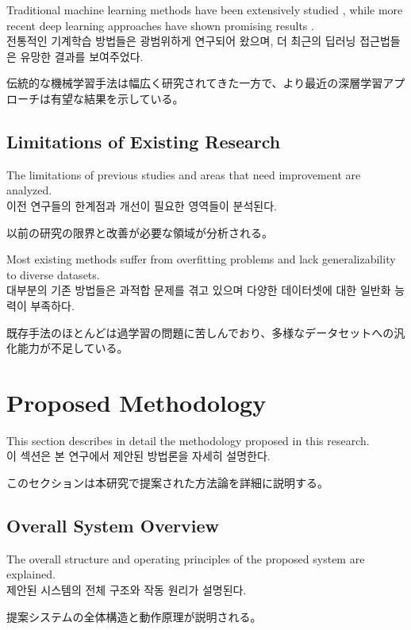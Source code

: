 \documentclass[preprint,12pt]{elsarticle}
\begin{document}
Traditional machine learning methods have been extensively studied \cite{hastie2009elements}, while more recent deep learning approaches have shown promising results \cite{schmidhuber2015deep}. \\
전통적인 기계학습 방법들은 광범위하게 연구되어 왔으며, 더 최근의 딥러닝 접근법들은 유망한 결과를 보여주었다. \\
\begin{CJK}{UTF8}{min}
伝統的な機械学習手法は幅広く研究されてきた一方で、より最近の深層学習アプローチは有望な結果を示している。
\end{CJK}

\subsection{Limitations of Existing Research}
The limitations of previous studies and areas that need improvement are analyzed. \\
이전 연구들의 한계점과 개선이 필요한 영역들이 분석된다. \\
\begin{CJK}{UTF8}{min}
以前の研究の限界と改善が必要な領域が分析される。
\end{CJK}

Most existing methods suffer from overfitting problems and lack generalizability to diverse datasets. \\
대부분의 기존 방법들은 과적합 문제를 겪고 있으며 다양한 데이터셋에 대한 일반화 능력이 부족하다. \\
\begin{CJK}{UTF8}{min}
既存手法のほとんどは過学習の問題に苦しんでおり、多様なデータセットへの汎化能力が不足している。
\end{CJK}

\section{Proposed Methodology}
\label{sec:methodology}

This section describes in detail the methodology proposed in this research. \\
이 섹션은 본 연구에서 제안된 방법론을 자세히 설명한다. \\
\begin{CJK}{UTF8}{min}
このセクションは本研究で提案された方法論を詳細に説明する。
\end{CJK}

\subsection{Overall System Overview}
The overall structure and operating principles of the proposed system are explained. \\
제안된 시스템의 전체 구조와 작동 원리가 설명된다. \\
\begin{CJK}{UTF8}{min}
提案システムの全体構造と動作原理が説明される。
\end{CJK}
\end{document}
